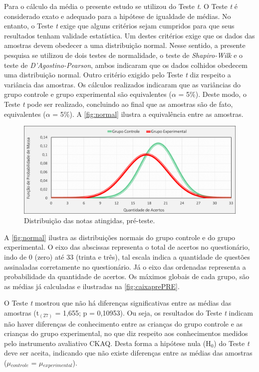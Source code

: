 Para o cálculo da média o presente estudo se utilizou do Teste \textit{t}. O Teste \textit{t} é considerado exato e adequado para a hipótese de igualdade de médias. No entanto, o Teste \textit{t} exige que alguns critérios sejam cumpridos para que seus resultados tenham validade estatística. Um destes critérios exige que os dados das amostras devem obedecer a uma distribuição normal. Nesse sentido, a presente pesquisa se utilizou de dois testes de normalidade, o teste de \textit{Shapiro-Wilk} e o teste de \textit{D'Agostino-Pearson}, ambos indicaram que  os dados colhidos obedecem uma distribuição normal. Outro critério exigido pelo Teste \textit{t} diz respeito a variância das amostras. Os cálculos realizados indicaram que as variâncias do grupo controle e grupo experimental são equivalentes ($\alpha$ = 5\%). Deste modo, o Teste \textit{t} pode ser realizado, concluindo ao final que as amostras são de fato, equivalentes ($\alpha$ = 5\%). A \autoref{fig:normal} ilustra a equivalência entre as amostras. 

\begin{figure}[htb]
    \centering
    \caption{\label{fig:normal}Distribuição das notas atingidas, pré-teste.}
    \includegraphics[width=\linewidth]{./Visuais/Graficos1.pdf}
  \vspace{-0.6cm}
\end{figure}

A \autoref{fig:normal} ilustra as distribuições normais do grupo controle e do grupo experimental. O eixo das abscissas representa o total de acertos no questionário, indo de 0 (zero) até 33 (trinta e três), tal escala indica a quantidade de questões assinaladas corretamente no questionário. Já o eixo das ordenadas representa a probabilidade da quantidade de acertos. Os máximos globais de cada grupo, são as médias já calculadas e ilustradas na \autoref{fig:caixaprePRE}.

O Teste \textit{t} mostrou que não há diferenças significativas entre as médias das amostras (t$_{(27)}$ = 1,655; p = 0,10953). Ou seja, os resultados do Teste \textit{t} indicam não haver diferenças de conhecimento entre as crianças do grupo controle e as crianças do grupo experimental, no que diz respeito aos conhecimentos medidos pelo instrumento avaliativo \ac{CKAQ}. Desta forma a hipótese nula (H$_0$) do Teste \textit{t} deve ser aceita, indicando que não existe diferenças entre as médias das amostras ($\mu$$_{controle}$ = $\mu$$_{experimental}$). 

